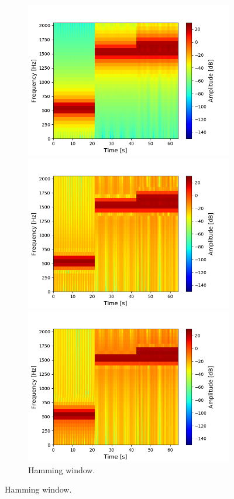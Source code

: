 \begin{figure}[H]
\centering
\begin{subfigure}{0.49\textwidth}
\centering
\includegraphics[width=\textwidth]{figures/stft_windows/100/hanning.png}
\caption{Hann window.}
\label{fig:stft_hanning_100}
\includegraphics[width=\textwidth]{figures/stft_windows/100/hamming.png}
\caption{Hamming window.}
\label{fig:stft_hamming_100}
\includegraphics[width=\textwidth]{figures/stft_windows/100/kaiser_4.png}

\end{subfigure}
\end{figure}
